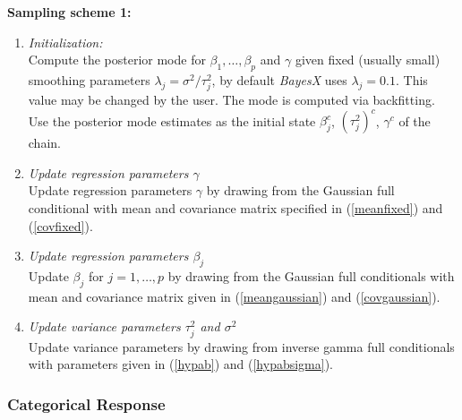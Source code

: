 \documentclass[11pt,a4paper,twoside]{bayesxarticle}
\begin{document}
{\bf Sampling scheme 1:}
\begin{enumerate}
\item {\em Initialization:} \\
Compute the posterior mode for $\beta_1,\dots,\beta_p$ and $\gamma$
given fixed (usually small) smoothing parameters $\lambda_j =
\sigma^2/\tau^2_j$, by default {\em BayesX} uses $\lambda_j = 0.1$.
This value may be changed by the user. The mode is computed via
backfitting. Use the posterior mode estimates as the initial state
$\beta_j^c$, $(\tau_j^2)^c$, $\gamma^c$ of the chain.
\item {\em Update regression parameters $\gamma$} \\
Update regression parameters $\gamma$ by drawing from the Gaussian
full conditional with mean and covariance matrix specified in
(\ref{meanfixed}) and (\ref{covfixed}).
\item {\em Update regression parameters $\beta_j$} \\
Update $\beta_j$ for $j=1,\dots,p$ by drawing from the Gaussian
full conditionals with mean and covariance matrix given in
(\ref{meangaussian}) and (\ref{covgaussian}).
\item {\em Update variance parameters $\tau^2_j$ and $\sigma^2$} \\
Update variance parameters by drawing from inverse gamma full
conditionals with parameters given in (\ref{hypab}) and
(\ref{hypabsigma}).
\end{enumerate}

\subsubsection{Categorical Response}
\label{mulitcategoricalresp} 
\end{document}
